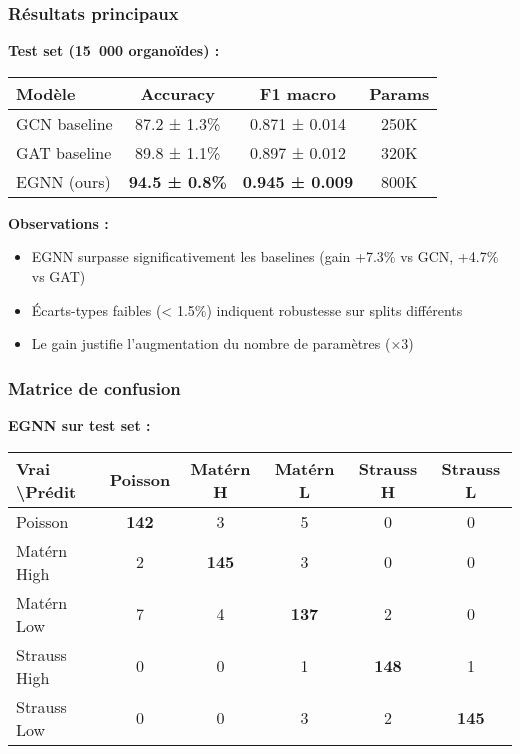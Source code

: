 \subsubsection{Résultats principaux}

\textbf{Test set (15~000 organoïdes) :}

\begin{center}
\begin{tabular}{|l|c|c|c|}
\hline
\textbf{Modèle} & \textbf{Accuracy} & \textbf{F1 macro} & \textbf{Params} \\
\hline
GCN baseline & 87.2 ± 1.3\% & 0.871 ± 0.014 & 250K \\
GAT baseline & 89.8 ± 1.1\% & 0.897 ± 0.012 & 320K \\
EGNN (ours) & \textbf{94.5 ± 0.8\%} & \textbf{0.945 ± 0.009} & 800K \\
\hline
\end{tabular}
\end{center}

\textbf{Observations :}
\begin{itemize}
    \item EGNN surpasse significativement les baselines (gain +7.3\% vs GCN, +4.7\% vs GAT)
    \item Écarts-types faibles (< 1.5\%) indiquent robustesse sur splits différents
    \item Le gain justifie l'augmentation du nombre de paramètres (×3)
\end{itemize}

\subsubsection{Matrice de confusion}

\textbf{EGNN sur test set :}

\begin{center}
\begin{tabular}{|l|c|c|c|c|c|}
\hline
\textbf{Vrai \textbackslash Prédit} & \textbf{Poisson} & \textbf{Matérn H} & \textbf{Matérn L} & \textbf{Strauss H} & \textbf{Strauss L} \\
\hline
Poisson & \textbf{142} & 3 & 5 & 0 & 0 \\
Matérn High & 2 & \textbf{145} & 3 & 0 & 0 \\
Matérn Low & 7 & 4 & \textbf{137} & 2 & 0 \\
Strauss High & 0 & 0 & 1 & \textbf{148} & 1 \\
Strauss Low & 0 & 0 & 3 & 2 & \textbf{145} \\
\hline
\end{tabular}
\end{center}

